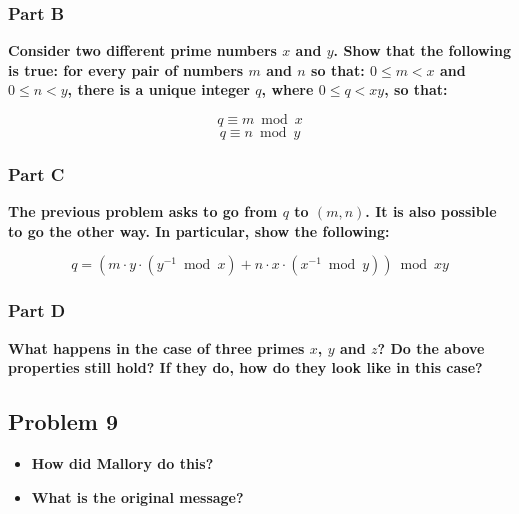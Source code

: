 \documentclass[11pt]{article}
\begin{document}
\subsubsection*{Part B} 

\textbf{Consider two different prime numbers $x$ and $y$. Show that the
following is true: for every pair of numbers $m$ and $n$ so that: $0
\leq m < x$ and $0 \leq n < y$, there is a unique integer $q$, where
$0 \leq q < xy$, so that:}

$$q \equiv m \bmod{x}$$
$$q \equiv n \bmod{y}$$
  
\subsubsection*{Part C}

\textbf{The previous problem asks to go from $q$ to $(m,n)$. It is also
possible to go the other way. In particular, show the following:}

$$q = ( m \cdot y \cdot (y^{-1} \bmod{x}) + n \cdot x \cdot
(x^{-1} \bmod{y}) ) \bmod{xy}$$



\subsubsection*{Part D} 

\textbf{What happens in the case of three primes $x$, $y$ and $z$? Do the
above properties still hold? If they do, how do they look like in this
case?}

\subsection*{Problem 9}

\begin{itemize}

\item \textbf{How did Mallory do this? }

\item \textbf{What is the original message?}

\end{itemize}
\end{document}
